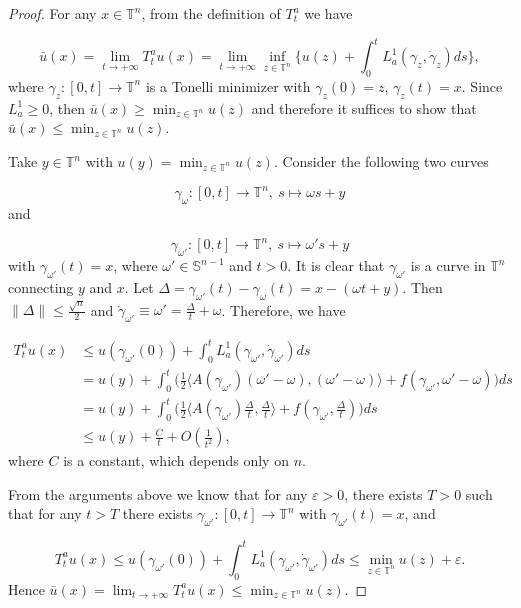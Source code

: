 \documentclass{amsart}[12pt]
\theoremstyle{definition}
\theoremstyle{remark}
\numberwithin{equation}{section}
\begin{document}
\begin{proof}
For any $x\in\mathbb{T}^n$, from the definition of $T^a_t$ we have

\[
\bar{u}(x)=\lim_{t\rightarrow+\infty}T^a_tu(x)
=\lim_{t\rightarrow+\infty}\inf_{z\in\mathbb{T}^n}
\{u(z)+\int_0^tL^1_a(\gamma_z,\dot{\gamma}_z)ds\},
\]
where $\gamma_z:[0,t]\rightarrow\mathbb{T}^n$ is a Tonelli
minimizer with $\gamma_z(0)=z$, $\gamma_z(t)=x$. Since $L^1_a\geq
0$, then $\bar{u}(x)\geq\min_{z\in\mathbb{T}^n}u(z)$ and therefore
it suffices to show that
$\bar{u}(x)\leq\min_{z\in\mathbb{T}^n}u(z)$.

Take $y\in\mathbb{T}^n$ with $u(y)=\min_{z\in\mathbb{T}^n}u(z)$.
Consider the following two curves

\[
\gamma_\omega:[0,t]\rightarrow\mathbb{T}^n,\  s\mapsto \omega s+y
\]
and

\[
\gamma_{\omega'}:[0,t]\rightarrow\mathbb{T}^n,\  s\mapsto \omega'
s+y
\]
with $\gamma_{\omega'}(t)=x$, where $\omega'\in\mathbb{S}^{n-1}$
and $t>0$. It is clear that $\gamma_{\omega'}$ is a curve in
$\mathbb{T}^n$ connecting $y$ and $x$. Let
$\Delta=\gamma_{\omega'}(t)-\gamma_\omega(t)=x-(\omega t+y)$. Then
$\|\Delta\|\leq\frac{\sqrt{n}}{2}$ and
$\dot{\gamma}_{\omega'}\equiv\omega'=\frac{\Delta}{t}+\omega$.
Therefore, we have

\begin{align*}
T^a_tu(x) & \leq
          u(\gamma_{\omega'}(0))+\int_0^tL^1_a(\gamma_{\omega'},\dot{\gamma}_{\omega'})ds\\
        & = u(y)+\int_0^t\Big(\frac{1}{2}\langle
        A(\gamma_{\omega'})(\omega'-\omega),(\omega'-\omega)\rangle+f(\gamma_{\omega'},\omega'-\omega)\Big)ds\\
        & = u(y)+\int_0^t\Big(\frac{1}{2}\Big\langle
        A(\gamma_{\omega'})\frac{\Delta}{t},\frac{\Delta}{t}\Big\rangle+f(\gamma_{\omega'},\frac{\Delta}{t})\Big)ds\\
        & \leq u(y)+\frac{C}{t}+O(\frac{1}{t^2}),
\end{align*}
where $C$ is a constant, which depends only on $n$.

From the arguments above we know that for any $\varepsilon>0$,
there exists $T>0$ such that for any $t>T$ there exists
$\gamma_{\omega'}:[0,t]\rightarrow\mathbb{T}^n$ with
$\gamma_{\omega'}(t)=x$, and

\[
T^a_tu(x)\leq
u(\gamma_{\omega'}(0))+\int_0^tL^1_a(\gamma_{\omega'},\dot{\gamma}_{\omega'})ds\leq
\min_{z\in\mathbb{T}^n}u(z)+\varepsilon.
\]
Hence
$\bar{u}(x)=\lim_{t\rightarrow+\infty}T^a_tu(x)\leq\min_{z\in\mathbb{T}^n}u(z)$.
\end{proof}
\end{document}
